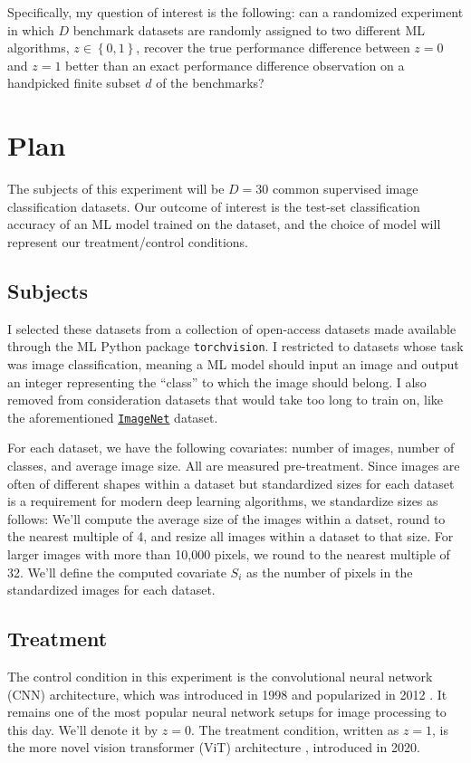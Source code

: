 \documentclass[11pt, oneside]{article}
\newcommand{\dataset}[2]{
    \href{#2}{\texttt{#1}}
}
\newcommand{\ImageNet}{\dataset{ImageNet}{https://www.image-net.org/about.php}}
\begin{document}
Specifically, my question of interest is the following: can a randomized
experiment in which $D$ benchmark datasets are randomly assigned to two
different ML algorithms, $z \in \left\{ 0, 1 \right\}$, recover the true
performance difference between $z = 0$ and $z = 1$ better than an exact
performance difference observation on a handpicked finite subset $d$ of the
benchmarks?

\section*{Plan}

The subjects of this experiment will be $D = 30$ common supervised image
classification datasets. Our outcome of interest is the test-set classification
accuracy of an ML model trained on the dataset, and the choice of model will
represent our treatment/control conditions.

\subsection*{Subjects}
I selected these datasets from a collection of open-access datasets made available
through the ML Python package \texttt{torchvision}. I restricted to datasets
whose task was image classification, meaning a ML model should input an image
and output an integer representing the ``class'' to which the image should
belong. I also removed from consideration datasets that would take too long to
train on, like the aforementioned \ImageNet dataset.

For each dataset, we have the following covariates: number of images, number of
classes, and average image size. All are measured pre-treatment. Since images
are often of different shapes within a dataset but standardized sizes for each
dataset is a requirement for modern deep learning algorithms, we standardize
sizes as follows: We'll compute the average size of the images within a datset,
round to the nearest multiple of 4, and resize all images within a dataset to
that size. For larger images with more than 10,000 pixels, we round to the
nearest multiple of 32. We'll define the computed covariate $S_i$ as the
number of pixels in the standardized images for each dataset.


\subsection*{Treatment}
The control condition in this experiment is the convolutional neural network
(CNN) architecture, which was introduced in 1998
\cite{lecunGradientbasedLearningApplied1998} and popularized in 2012
\cite{krizhevskyImageNetClassificationDeep2012}. It remains one of the most
popular neural network setups for image processing to this day. We'll denote it
by $z = 0$. The treatment condition, written as $z = 1$, is the more novel
vision transformer (ViT) architecture \cite{dosovitskiyImageWorth16x162021},
introduced in 2020.
\end{document}
